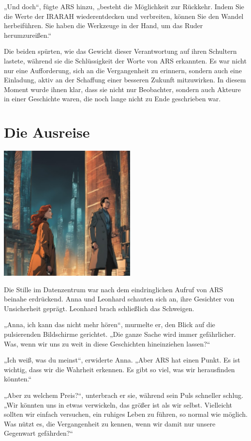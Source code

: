 \documentclass[
]{article}
\begin{document}
„Und doch``, fügte ARS hinzu, „besteht die Möglichkeit zur Rückkehr.
Indem Sie die Werte der IRARAH wiederentdecken und verbreiten, können
Sie den Wandel herbeiführen. Sie haben die Werkzeuge in der Hand, um das
Ruder herumzureißen.``

Die beiden spürten, wie das Gewicht dieser Verantwortung auf ihren
Schultern lastete, während sie die Schlüssigkeit der Worte von ARS
erkannten. Es war nicht nur eine Aufforderung, sich an die Vergangenheit
zu erinnern, sondern auch eine Einladung, aktiv an der Schaffung einer
besseren Zukunft mitzuwirken. In diesem Moment wurde ihnen klar, dass
sie nicht nur Beobachter, sondern auch Akteure in einer Geschichte
waren, die noch lange nicht zu Ende geschrieben war.

\section{Die Ausreise}\label{die-ausreise}

\includegraphics[width=2.71875in,height=2.6875in]{media/image0006.png}

Die Stille im Datenzentrum war nach dem eindringlichen Aufruf von ARS
beinahe erdrückend. Anna und Leonhard schauten sich an, ihre Gesichter
von Unsicherheit geprägt. Leonhard brach schließlich das Schweigen.

„Anna, ich kann das nicht mehr hören``, murmelte er, den Blick auf die
pulsierenden Bildschirme gerichtet. „Die ganze Sache wird immer
gefährlicher. Was, wenn wir uns zu weit in diese Geschichten
hineinziehen lassen?{\kern0pt}``

„Ich weiß, was du meinst``, erwiderte Anna. „Aber ARS hat einen Punkt.
Es ist wichtig, dass wir die Wahrheit erkennen. Es gibt so viel, was wir
herausfinden könnten.``

„Aber zu welchem Preis?{\kern0pt}``, unterbrach er sie, während sein
Puls schneller schlug. „Wir könnten uns in etwas verwickeln, das größer
ist als wir selbst. Vielleicht sollten wir einfach versuchen, ein
ruhiges Leben zu führen, so normal wie möglich. Was nützt es, die
Vergangenheit zu kennen, wenn wir damit nur unsere Gegenwart
gefährden?{\kern0pt}``
\end{document}
